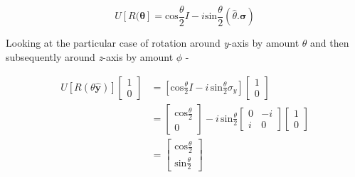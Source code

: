 \begin{alphaparts}
\begin{equation*}
        U[R(\boldsymbol{\theta}] = \textrm{cos}\frac{\theta}{2}I - i\textrm{sin}\frac{\theta}{2}(\hat{\theta}.\boldsymbol{\sigma})
\end{equation*}

Looking at the particular case of rotation around \textit{y}-axis by amount $\theta$ and then subsequently around \textit{z}-axis by amount $\phi$ - 

\begin{equation*}
    \begin{split}
        U[R(\theta\hat{\mathbf{y}})]
        \begin{bmatrix}
            1 \\
            0
        \end{bmatrix} & = \left[ \textrm{cos}\frac{\theta}{2}I - i \, \textrm{sin}\frac{\theta}{2}\sigma_{y}\right]
        \begin{bmatrix}
            1 \\
            0
        \end{bmatrix} \\
        & = 
        \begin{bmatrix}
            \textrm{cos}\frac{\theta}{2} \\
            0
        \end{bmatrix} - i \, \textrm{sin}\frac{\theta}{2}
        \begin{bmatrix}
            0 & -i \\
            i & 0
        \end{bmatrix}
        \begin{bmatrix}
            1 \\
            0
        \end{bmatrix} \\
        & = 
        \begin{bmatrix}
            \textrm{cos}\frac{\theta}{2} \\
            \textrm{sin}\frac{\theta}{2}
        \end{bmatrix}
    \end{split}
\end{equation*}


\end{alphaparts}
